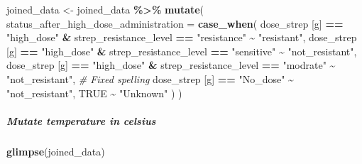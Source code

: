\documentclass[
]{article}
\newenvironment{Shaded}{\begin{snugshade}}{\end{snugshade}}
\newcommand{\AttributeTok}[1]{\textcolor[rgb]{0.13,0.29,0.53}{#1}}
\newcommand{\CommentTok}[1]{\textcolor[rgb]{0.56,0.35,0.01}{\textit{#1}}}
\newcommand{\ConstantTok}[1]{\textcolor[rgb]{0.56,0.35,0.01}{#1}}
\newcommand{\FunctionTok}[1]{\textcolor[rgb]{0.13,0.29,0.53}{\textbf{#1}}}
\newcommand{\NormalTok}[1]{#1}
\newcommand{\OtherTok}[1]{\textcolor[rgb]{0.56,0.35,0.01}{#1}}
\newcommand{\SpecialCharTok}[1]{\textcolor[rgb]{0.81,0.36,0.00}{\textbf{#1}}}
\newcommand{\StringTok}[1]{\textcolor[rgb]{0.31,0.60,0.02}{#1}}
\begin{document}
\begin{Shaded}
\begin{Highlighting}[]
\NormalTok{joined\_data }\OtherTok{\textless{}{-}}\NormalTok{ joined\_data }\SpecialCharTok{\%\textgreater{}\%}
  \FunctionTok{mutate}\NormalTok{(}
    \AttributeTok{status\_after\_high\_dose\_administration =} \FunctionTok{case\_when}\NormalTok{(}
      \StringTok{\textasciigrave{}}\AttributeTok{dose\_strep [g]}\StringTok{\textasciigrave{}} \SpecialCharTok{==} \StringTok{"high\_dose"} \SpecialCharTok{\&}\NormalTok{ strep\_resistance\_level }\SpecialCharTok{==} \StringTok{"resistance"} \SpecialCharTok{\textasciitilde{}} \StringTok{"resistant"}\NormalTok{,}
      \StringTok{\textasciigrave{}}\AttributeTok{dose\_strep [g]}\StringTok{\textasciigrave{}} \SpecialCharTok{==} \StringTok{"high\_dose"} \SpecialCharTok{\&}\NormalTok{ strep\_resistance\_level }\SpecialCharTok{==} \StringTok{"sensitive"} \SpecialCharTok{\textasciitilde{}} \StringTok{"not\_resistant"}\NormalTok{, }
      \StringTok{\textasciigrave{}}\AttributeTok{dose\_strep [g]}\StringTok{\textasciigrave{}} \SpecialCharTok{==} \StringTok{"high\_dose"} \SpecialCharTok{\&}\NormalTok{ strep\_resistance\_level }\SpecialCharTok{==} \StringTok{"modrate"} \SpecialCharTok{\textasciitilde{}} \StringTok{"not\_resistant"}\NormalTok{,  }\CommentTok{\# Fixed spelling}
      \StringTok{\textasciigrave{}}\AttributeTok{dose\_strep [g]}\StringTok{\textasciigrave{}} \SpecialCharTok{==} \StringTok{"No\_dose"} \SpecialCharTok{\textasciitilde{}} \StringTok{"not\_resistant"}\NormalTok{,}
      \ConstantTok{TRUE} \SpecialCharTok{\textasciitilde{}} \StringTok{"Unknown"}
\NormalTok{    )}
\NormalTok{  )}
\end{Highlighting}
\end{Shaded}

\subparagraph{Mutate temperature in
celsius}\label{mutate-temperature-in-celsius}

\begin{Shaded}
\begin{Highlighting}[]
\FunctionTok{glimpse}\NormalTok{(joined\_data)}
\end{Highlighting}
\end{Shaded}
\end{document}
